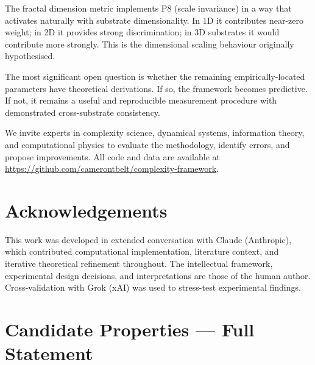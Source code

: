 \documentclass[12pt,a4paper]{article}
\begin{document}
The fractal dimension metric implements P8 (scale invariance) in a
way that activates naturally with substrate dimensionality.
In 1D it contributes near-zero weight; in 2D it provides strong
discrimination; in 3D substrates it would contribute more strongly.
This is the dimensional scaling behaviour originally hypothesised.

The most significant open question is whether the remaining
empirically-located parameters have theoretical derivations.
If so, the framework becomes predictive.
If not, it remains a useful and reproducible measurement procedure
with demonstrated cross-substrate consistency.

We invite experts in complexity science, dynamical systems,
information theory, and computational physics to evaluate the
methodology, identify errors, and propose improvements.
All code and data are available at
\url{https://github.com/camerontbelt/complexity-framework}.

\section*{Acknowledgements}

This work was developed in extended conversation with Claude
(Anthropic), which contributed computational implementation,
literature context, and iterative theoretical refinement throughout.
The intellectual framework, experimental design decisions, and
interpretations are those of the human author.
Cross-validation with Grok (xAI) was used to stress-test
experimental findings.

\appendix
\section{Candidate Properties --- Full Statement}
\end{document}
